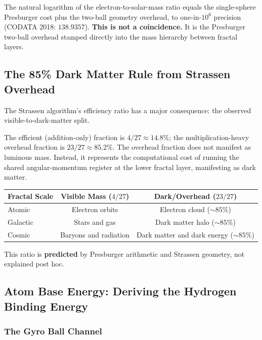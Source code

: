 \documentclass[11pt,a4paper]{article}
\begin{document}
The natural logarithm of the electron-to-solar-mass ratio equals the single-sphere
Presburger cost plus the two-ball geometry overhead, to one-in-$10^6$ precision
(CODATA 2018: $138.9357$). \textbf{This is not a coincidence.} It is the Presburger
two-ball overhead stamped directly into the mass hierarchy between fractal layers.

\subsection{The 85\% Dark Matter Rule from Strassen Overhead}

The Strassen algorithm's efficiency ratio has a major consequence: the observed
visible-to-dark-matter split.

The efficient (addition-only) fraction is $4/27 \approx 14.8\%$; the
multiplication-heavy overhead fraction is $23/27 \approx 85.2\%$. The overhead
fraction does not manifest as luminous mass. Instead, it represents the
computational cost of running the shared angular-momentum register at the lower
fractal layer, manifesting as dark matter.

\begin{table}[h]
\centering
\begin{tabular}{|l|c|c|}
\hline
\textbf{Fractal Scale} & \textbf{Visible Mass ($4/27$)} & \textbf{Dark/Overhead ($23/27$)} \\
\hline
Atomic    & Electron orbits           & Electron cloud ($\sim85\%$)              \\
\hline
Galactic  & Stars and gas             & Dark matter halo ($\sim85\%$)            \\
\hline
Cosmic    & Baryons and radiation     & Dark matter and dark energy ($\sim85\%$) \\
\hline
\end{tabular}
\end{table}

This ratio is \textbf{predicted} by Presburger arithmetic and Strassen geometry,
not explained post hoc.

\subsection{Atom Base Energy: Deriving the Hydrogen Binding Energy}

\subsubsection{The Gyro Ball Channel}
\end{document}
